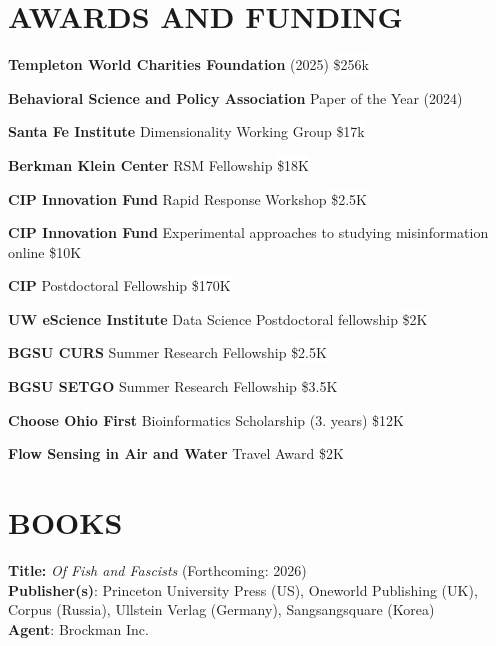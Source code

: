 \documentclass[paper=a4,fontsize=11pt]{scrartcl}
\newcommand{\NewPart}[1]{\section*{\uppercase{#1}}}
\newcommand{\EducationEntry}[4]{
		\noindent \textbf{#1} \hfill 					%
		\colorbox{White}{%
			\parbox{10em}{%
			\hfill\color{Black}#2}} \par				%
		\noindent \textit{#3} \par					%
		\noindent\hangindent=2em\hangafter=0 \small #4 	%
		\normalsize \par}
\newcommand{\WorkEntry}[4]{						%
		\noindent \textbf{#1} \hfill 					%
		\colorbox{White}{\color{Black}#2} \par		%
		\noindent \textit{#3} \par					%
		\noindent\hangindent=2em\hangafter=0 \small #4 	%
		\normalsize \par}
\newcommand{\talkEntry}[2]{						%
		\noindent #1 \hfill 					%
		\colorbox{White}{\color{Black}#2} \par		%
		}
\begin{document}
\NewPart{Awards and Funding}{}
\talkEntry{\textbf{Templeton World Charities Foundation} (2025)}{\$256k}
\talkEntry{\textbf{Behavioral Science and Policy Association} Paper of the Year (2024)}{}
\talkEntry{\textbf{Santa Fe Institute} Dimensionality Working Group}{\$17k}
\talkEntry{\textbf{Berkman Klein Center} RSM Fellowship}{\$18K}
\talkEntry{\textbf{CIP Innovation Fund} Rapid Response Workshop}{\$2.5K}
\talkEntry{\textbf{CIP Innovation Fund} Experimental approaches to studying misinformation online}{\$10K}
\talkEntry{\textbf{CIP} Postdoctoral Fellowship}{\$170K}
\talkEntry{\textbf{UW eScience Institute} Data Science Postdoctoral fellowship}{\$2K}
\talkEntry{\textbf{BGSU CURS} Summer Research Fellowship}{\$2.5K}
\talkEntry{\textbf{BGSU SETGO} Summer Research Fellowship}{\$3.5K}
\talkEntry{\textbf{Choose Ohio First} Bioinformatics Scholarship (3. years)}{\$12K}
\talkEntry{\textbf{Flow Sensing in Air and Water} Travel Award}{\$2K}



\NewPart{Books}{}
\textbf{Title:} \textit{Of Fish and Fascists} (Forthcoming: 2026)\\
\textbf{Publisher(s)}: Princeton University Press (US), Oneworld Publishing (UK), Corpus (Russia), Ullstein Verlag (Germany), Sangsangsquare (Korea)\\
\textbf{Agent}: Brockman Inc. 
\end{document}
